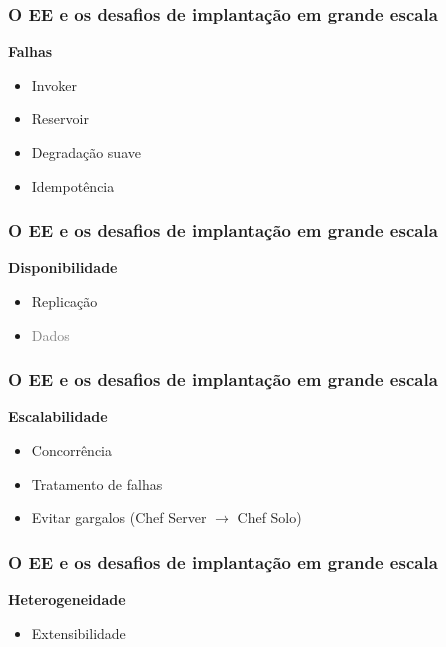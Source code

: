 \documentclass{beamer}
\newcommand\subtitulo[1]{{\large \textbf{#1}}}
\begin{document}

\begin{frame}
\frametitle{O EE e os desafios de implantação em grande escala}

\subtitulo{Falhas}

\begin{itemize}
\item Invoker
\item Reservoir
\item Degradação suave
\item Idempotência
\end{itemize}

\end{frame}



\begin{frame}
\frametitle{O EE e os desafios de implantação em grande escala}

\subtitulo{Disponibilidade}

\begin{itemize}
\item Replicação
\item \textcolor{gray}{Dados}
\end{itemize}

\end{frame}



\begin{frame}
\frametitle{O EE e os desafios de implantação em grande escala}

\subtitulo{Escalabilidade}

\begin{itemize}
\item Concorrência
\item Tratamento de falhas
\item Evitar gargalos (Chef Server $\rightarrow$ Chef Solo)
\end{itemize}

\end{frame}



\begin{frame}
\frametitle{O EE e os desafios de implantação em grande escala}

\subtitulo{Heterogeneidade}

\begin{itemize}
\item Extensibilidade
\end{itemize}

\end{frame}
\end{document}
